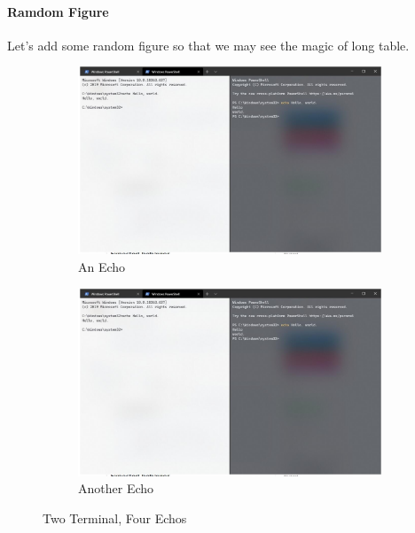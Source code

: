 \documentclass{article}
\begin{document}
\paragraph{Ramdom Figure}
Let's add some random figure so that we may see the magic of long table.

\begin{figure}[!ht]
    \centering
    \begin{subfigure}[b]{0.4\linewidth}
        \includegraphics[width=\linewidth]{echos.jpg}
        \caption{An Echo}
    \end{subfigure}
    \begin{subfigure}[b]{0.4\linewidth}
        \includegraphics[width=\linewidth]{echos.jpg}
        \caption{Another Echo}
    \end{subfigure}
    \caption{Two Terminal, Four Echos}
    \label{fig:TwoTerminal_random2}
\end{figure}
\end{document}

